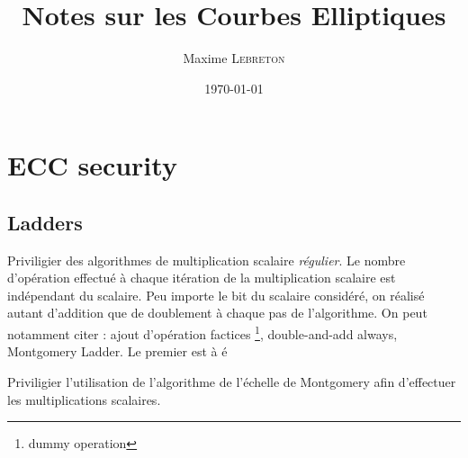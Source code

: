 \documentclass[a4paper]{report}
\title{Notes sur les Courbes Elliptiques}
\author{Maxime \textsc{Lebreton}} %
\date{\today}
\begin{document}
\maketitle
\newpage
\tableofcontents
\newpage



\addtolength{\parskip}{1em}





























\chapter{ECC security}
\section{Ladders}
Priviligier des algorithmes de multiplication scalaire \emph{régulier}. Le nombre d'opération effectué à chaque itération de la multiplication scalaire est indépendant du scalaire. Peu importe le bit du scalaire considéré, on réalisé autant d'addition que de doublement à chaque pas de l'algorithme. On peut notamment citer : ajout d'opération factices \footnote{dummy operation}, double-and-add always, Montgomery Ladder. Le premier est à é

Priviligier l'utilisation de l'algorithme de l'échelle de Montgomery afin d'effectuer les multiplications scalaires. 
\end{document}
